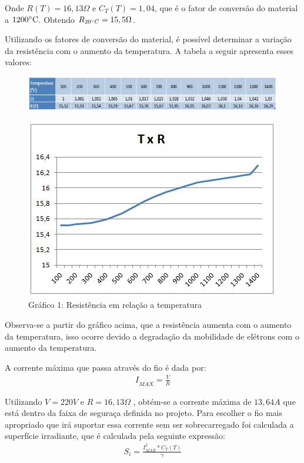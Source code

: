 Onde $R(T)=16,13\Omega$ e $C_{T}(T)=1,04$, que é o fator de conversão do material a $1200\degree \text{C}$. Obtendo $R_{20\degree C}=15,5\Omega$.

Utilizando os fatores de conversão do material, é possível determinar a variação da resistência com o aumento da temperatura. A tabela a seguir apresenta esses valores:
\begin{figure}[ht]
	\centering
	\label{tabela1}
	\includegraphics[keepaspectratio=true,scale=0.9]{figuras/alimentacao0.JPG}
\end{figure}
\begin{figure}[!h]
	\centering
	\label{grafico1}
	\includegraphics[keepaspectratio=true,scale=0.8]{figuras/alimentacao0_1.JPG}
	\caption{Gráfico 1:  Resistência em relação a temperatura}
\end{figure}

Observa-se a partir do gráfico acima, que a resistência aumenta com o aumento da temperatura, isso ocorre devido a degradação da  mobilidade de elétrons com o aumento da temperatura.

A corrente máxima que passa através do fio é dada por:
\begin{gather}
    I_{M\acute{A}X} = \frac{V}{R}
\end{gather}

Utilizando $V=220V$ e $R=16,13\Omega$ , obtém-se a corrente máxima de $13,64 A$ que está dentro da faixa de seguraça definida no projeto. Para escolher o fio mais apropriado que irá suportar essa corrente sem ser sobrecarregado foi calculada a superfície irradiante, que é calculada pela seguinte expressão:
\begin{gather}
    S_i = \frac{I_{M\acute{A}X}^{2}*C_T(T)}{\gamma}
\end{gather}

